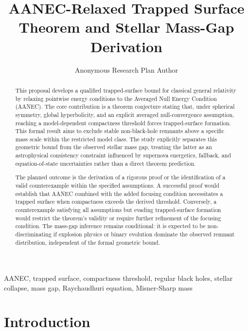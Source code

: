 \documentclass[conference]{IEEEtran}
\begin{document}
\title{AANEC-Relaxed Trapped Surface Theorem and Stellar Mass-Gap Derivation}\author{Anonymous Research Plan Author}\maketitle

\begin{abstract}
This proposal develops a qualified trapped-surface bound for classical general relativity by relaxing pointwise energy conditions to the Averaged Null Energy Condition (AANEC). The core contribution is a theorem conjecture stating that, under spherical symmetry, global hyperbolicity, and an explicit averaged null-convergence assumption, reaching a model-dependent compactness threshold forces trapped-surface formation. This formal result aims to exclude stable non-black-hole remnants above a specific mass scale within the restricted model class. The study explicitly separates this geometric bound from the observed stellar mass gap, treating the latter as an astrophysical consistency constraint influenced by supernova energetics, fallback, and equation-of-state uncertainties rather than a direct theorem prediction.

The planned outcome is the derivation of a rigorous proof or the identification of a valid counterexample within the specified assumptions. A successful proof would establish that AANEC combined with the added focusing condition necessitates a trapped surface when compactness exceeds the derived threshold. Conversely, a counterexample satisfying all assumptions but evading trapped-surface formation would restrict the theorem's validity or require further refinement of the focusing condition. The mass-gap inference remains conditional: it is expected to be non-discriminating if explosion physics or binary evolution dominate the observed remnant distribution, independent of the formal geometric bound.
\end{abstract}
\begin{IEEEkeywords}
AANEC, trapped surface, compactness threshold, regular black holes, stellar collapse, mass gap, Raychaudhuri equation, Misner-Sharp mass
\end{IEEEkeywords}\section{Introduction}
\end{document}

